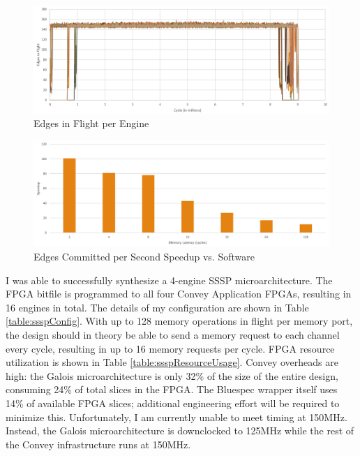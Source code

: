 \begin{figure}
\centering
\includegraphics[width=15cm, keepaspectratio]{pics/edgesInFlight.png}
\caption{Edges in Flight per Engine}
\label{fig:edgesInFlight}
\end{figure}

\begin{figure}
\centering
\includegraphics[width=15cm, keepaspectratio]{pics/speedup.png}
\caption{Edges Committed per Second Speedup vs. Software}
\label{fig:speedup}
\end{figure}

I was able to successfully synthesize a 4-engine SSSP microarchitecture. The FPGA bitfile is programmed to all four 
Convey Application FPGAs, resulting in 16 engines in total. The details of my configuration are shown in Table 
\ref{table:ssspConfig}. With up to 128 memory operations in flight per memory port, the design should in theory be able 
to send a memory request to each channel every cycle, resulting in up to 16 memory requests per cycle. FPGA resource 
utilization is shown in Table \ref{table:ssspResourceUsage}. Convey overheads are high: the Galois microarchitecture 
is only 32\% of the size of the entire design, consuming 24\% of total slices in the FPGA. The Bluespec wrapper itself 
uses 14\% of available FPGA slices; additional engineering effort will be required to minimize this. Unfortunately, I 
am currently unable to meet timing at 150MHz. Instead, the Galois microarchitecture is downclocked to 125MHz while 
the rest of the Convey infrastructure runs at 150MHz. 

